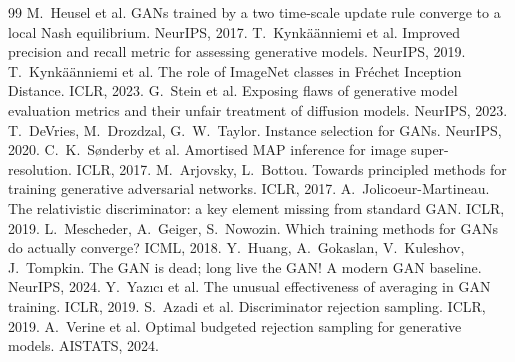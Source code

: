 \begin{thebibliography}{99}\setlength{\itemsep}{0pt}
 M.~Heusel et al. GANs trained by a two time-scale update rule converge to a local Nash equilibrium. NeurIPS, 2017.
 T.~Kynkäänniemi et al. Improved precision and recall metric for assessing generative models. NeurIPS, 2019.
 T.~Kynkäänniemi et al. The role of ImageNet classes in Fréchet Inception Distance. ICLR, 2023.
 G.~Stein et al. Exposing flaws of generative model evaluation metrics and their unfair treatment of diffusion models. NeurIPS, 2023.
 T.~DeVries, M.~Drozdzal, G.~W.~Taylor. Instance selection for GANs. NeurIPS, 2020.
 C.~K.~Sønderby et al. Amortised MAP inference for image super-resolution. ICLR, 2017.
 M.~Arjovsky, L.~Bottou. Towards principled methods for training generative adversarial networks. ICLR, 2017.
 A.~Jolicoeur-Martineau. The relativistic discriminator: a key element missing from standard GAN. ICLR, 2019.
 L.~Mescheder, A.~Geiger, S.~Nowozin. Which training methods for GANs do actually converge? ICML, 2018.
 Y.~Huang, A.~Gokaslan, V.~Kuleshov, J.~Tompkin. The GAN is dead; long live the GAN! A modern GAN baseline. NeurIPS, 2024.
 Y.~Yazıcı et al. The unusual effectiveness of averaging in GAN training. ICLR, 2019.
 S.~Azadi et al. Discriminator rejection sampling. ICLR, 2019.
 A.~Verine et al. Optimal budgeted rejection sampling for generative models. AISTATS, 2024.
\end{thebibliography}
